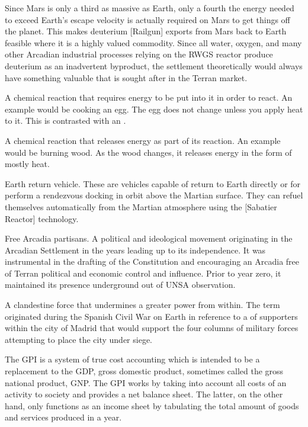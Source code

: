 Since Mars is only a third as massive as Earth, only a fourth the energy needed to exceed Earth's escape velocity is actually required on Mars to get things off the planet. This makes deuterium [Railgun] exports from Mars back to Earth feasible where it is a highly valued commodity. Since all water, oxygen, and many other Arcadian industrial processes relying on the RWGS reactor produce deuterium as an inadvertent byproduct, the settlement theoretically would always have something valuable that is sought after in the Terran market.

A chemical reaction that requires energy to be put into it in order to react. An example would be cooking an egg. The egg does not change unless you apply heat to it. This is contrasted with an .

A chemical reaction that releases energy as part of its reaction. An example would be burning wood. As the wood changes, it releases energy in the form of mostly heat.

Earth return vehicle. These are vehicles capable of return to Earth directly or for perform a rendezvous docking in orbit above the Martian surface. They can refuel themselves automatically from the Martian atmosphere using the [Sabatier Reactor] technology.

Free Arcadia partisans. A political and ideological movement originating in the Arcadian Settlement in the years leading up to its independence. It was instrumental in the drafting of the Constitution and encouraging an Arcadia free of Terran political and economic control and influence. Prior to year zero, it maintained its presence underground out of UNSA observation.

A clandestine force that undermines a greater power from within. The term originated during the Spanish Civil War on Earth in reference to a  of supporters within the city of Madrid that would support the four columns of military forces attempting to place the city under siege.

The GPI is a system of true cost accounting which is intended to be a replacement to the GDP, gross domestic product, sometimes called the gross national product, GNP. The GPI works by taking into account all costs of an activity to society and provides a net balance sheet. The latter, on the other hand, only functions as an income sheet by tabulating the total amount of goods and services produced in a year. 

